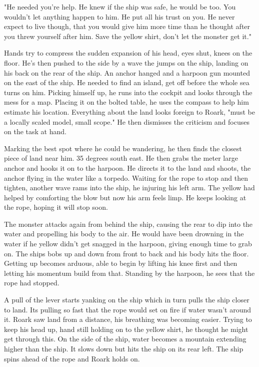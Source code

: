         "He needed you're help. He knew if the ship was safe, he would be too. You wouldn't let anything happen to him. He put all his trust on
    you. He never expect to live though, that you would give him more time than he thought after you threw yourself after him. Save the yellow
    shirt, don't let the monster get it."

        Hands try to compress the sudden expansion of his head, eyes shut, knees on the floor. He's then pushed to the side by a wave the jumps
    on the ship, landing on his back on the rear of the ship. An anchor hanged and a harpoon gun mounted on the east of the ship. He needed to
    find an island, get off before the whole sea turns on him. Picking himself up, he runs into the cockpit and looks through the mess for a
    map. Placing it on the bolted table, he uses the compass to help him estimate his location. Everything about the land looks foreign to
    Roark, "must be a locally scaled model, small scope." He then dismisses the criticism and focuses on the task at hand.

        Marking the best spot where he could be wandering, he then finds the closest piece of land near him. 35 degrees south east. He then
    grabs the meter large anchor and hooks it on to the harpoon. He directs it to the land and shoots, the anchor flying in the water like a 
    torpedo. Waiting for the rope to stop and then tighten, another wave rams into the ship, he injuring his left arm. The yellow had helped by
    comforting the blow but now his arm feels limp. He keeps looking at the rope, hoping it will stop soon.

        The monster attacks again from behind the ship, causing the rear to dip into the water and propelling his body to the air. He would
    have been drowning in the water if he yellow didn't get snagged in the harpoon, giving enough time to grab on. The ships bobs up and down
    from front to back and his body hits the floor. Getting up becomes arduous, able to begin by lifting his knee first and then letting his
    momentum build from that. Standing by the harpoon, he sees that the rope had stopped.

        A pull of the lever starts yanking on the ship which in turn pulls the ship closer to land. Its pulling so fast that the rope would set
    on fire if water wasn't around it. Roark saw land from a distance, his breathing was becoming easier. Trying to keep his head up, hand still
    holding on to the yellow shirt, he thought he might get through this. On the side of the ship, water becomes a mountain extending higher
    than the ship. It slows down but hits the ship on its rear left. The ship spins ahead of the rope and Roark holds on.


